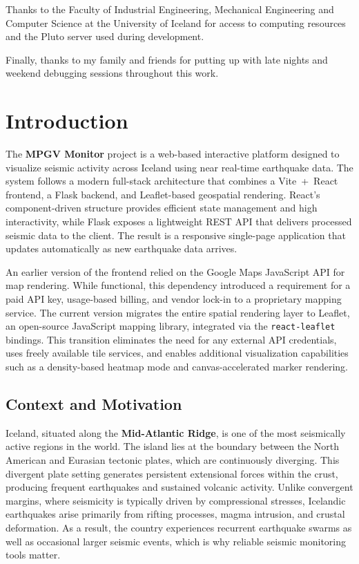 \documentclass[12pt]{article}
\begin{document}
Thanks to the Faculty of Industrial Engineering, Mechanical Engineering and Computer Science at the University of Iceland for access to computing resources and the Pluto server used during development.

Finally, thanks to my family and friends for putting up with late nights and weekend debugging sessions throughout this work.

\clearpage
\null
\thispagestyle{empty}
\newpage


\section{Introduction}
The \textbf{MPGV Monitor} project is a web-based interactive platform designed to visualize seismic activity across Iceland using near real-time earthquake data. The system follows a modern full-stack architecture that combines a Vite~+~React frontend, a Flask backend, and Leaflet-based geospatial rendering. React’s component-driven structure provides efficient state management and high interactivity, while Flask exposes a lightweight REST API that delivers processed seismic data to the client. The result is a responsive single-page application that updates automatically as new earthquake data arrives.

An earlier version of the frontend relied on the Google Maps JavaScript API for map rendering. While functional, this dependency introduced a requirement for a paid API key, usage-based billing, and vendor lock-in to a proprietary mapping service. The current version migrates the entire spatial rendering layer to Leaflet, an open-source JavaScript mapping library, integrated via the \texttt{react-leaflet} bindings. This transition eliminates the need for any external API credentials, uses freely available tile services, and enables additional visualization capabilities such as a density-based heatmap mode and canvas-accelerated marker rendering.

\subsection*{Context and Motivation}
Iceland, situated along the \textbf{Mid-Atlantic Ridge}, is one of the most seismically active regions in the world. The island lies at the boundary between the North American and Eurasian tectonic plates, which are continuously diverging. This divergent plate setting generates persistent extensional forces within the crust, producing frequent earthquakes and sustained volcanic activity. Unlike convergent margins, where seismicity is typically driven by compressional stresses, Icelandic earthquakes arise primarily from rifting processes, magma intrusion, and crustal deformation. As a result, the country experiences recurrent earthquake swarms as well as occasional larger seismic events, which is why reliable seismic monitoring tools matter.
\end{document}
